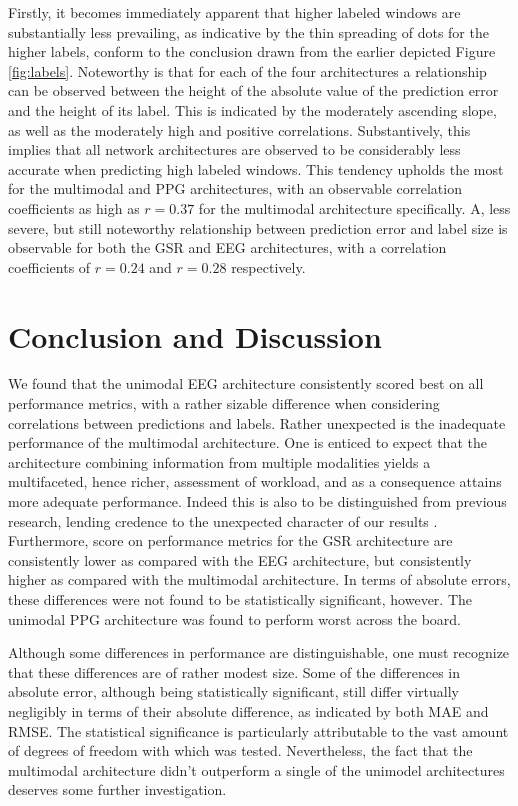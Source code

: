 \documentclass[12pt]{article}
\begin{document}
Firstly, it becomes immediately apparent that higher labeled windows are substantially less prevailing, as indicative by the thin spreading of dots for the higher labels, conform to the conclusion drawn from the earlier depicted Figure \ref{fig:labels}. Noteworthy is that for each of the four architectures a relationship can be observed between the height of the absolute value of the prediction error and the height of its label. This is indicated by the moderately ascending slope, as well as the moderately high and positive correlations. Substantively, this implies that all network architectures are observed to be considerably less accurate when predicting high labeled windows.  This tendency upholds the most for the multimodal and PPG architectures, with an observable correlation coefficients as high as $r=0.37$ for the multimodal architecture specifically.  A, less severe, but still noteworthy relationship between prediction error and label size is observable for both the GSR and EEG architectures,  with a correlation coefficients of $r=0.24$ and $r=0.28$ respectively.

\newpage
\section{Conclusion and Discussion}
We found that the unimodal EEG architecture consistently scored best on all performance metrics,  with a rather sizable difference when considering correlations between predictions and labels. Rather unexpected is the inadequate performance of the multimodal architecture. One is enticed to expect that the architecture combining information from multiple modalities yields a multifaceted, hence richer, assessment of workload, and as a consequence attains more adequate performance. Indeed this is also to be distinguished from previous research, lending credence to the unexpected character of our results \cite{dolmans2020perceived} \cite{han2020classification} \cite{rastgoo2019automatic}. Furthermore, score on performance metrics for the GSR architecture are consistently lower as compared with the EEG architecture, but consistently higher as compared with the multimodal architecture. In terms of absolute errors, these differences were not found to be statistically significant, however.  The unimodal PPG architecture was found to perform worst across the board. 

Although some differences in performance are distinguishable, one must recognize that these differences are of rather modest size. Some of the differences in absolute error, although being statistically significant, still differ virtually negligibly in terms of their absolute difference, as indicated by both MAE and RMSE. The statistical significance is particularly attributable to the vast amount of degrees of freedom with which was tested. Nevertheless, the fact that the multimodal architecture didn't outperform a single of the unimodel architectures deserves some further investigation.  
\end{document}
